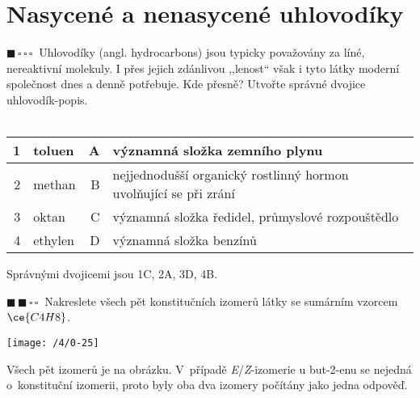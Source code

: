 \documentclass{book}
\newcommand{\jeden}{$\blacksquare \, \square \, \square \, \square \; \; $}
\newcommand{\dva}{$\blacksquare \, \blacksquare \, \square \, \square \; \; $}
\renewenvironment{quotation}{\par}{\par} %
\begin{document}
\section{Nasycené a nenasycené uhlovodíky}

\begin{quotation}
\jeden Uhlovodíky (angl. hydrocarbons) jsou typicky považovány za líné, nereaktivní
molekuly. I přes jejich zdánlivou ,,lenost`` však i tyto látky moderní společnost dnes
a denně  potřebuje. Kde přesně? Utvořte správné
dvojice uhlovodík-popis.\\
 \\
\end{quotation} \dotfill \par 
\begin{center}
\begin{tabular}{ r|l||r|l }

1 & toluen & A & významná složka zemního plynu \\\hline
2 & methan & B & nejjednodušší organický rostlinný hormon uvolňující se při zrání \\\hline
3 & oktan & C & významná složka ředidel, průmyslové rozpouštědlo \\\hline
4 & ethylen & D & významná složka benzínů \\
\end{tabular}
\end{center}
Správnými dvojicemi jsou 1C, 2A, 3D, 4B.

\hrulefill %
\begin{quotation}
\dva Nakreslete všech pět konstitučních izomerů látky se sumárním vzorcem
$\ce{C4H8}$.
\end{quotation} \dotfill \par 
\noindent \begin{center}

\texttt{[image: /4/0-25]}

\par\end{center}

Všech pět izomerů je na obrázku. V~případě \textit{E}/\textit{Z}-izomerie
u but-2-enu se nejedná o~konstituční izomerii, proto byly oba dva
izomery počítány jako jedna odpověď.
\end{document}
